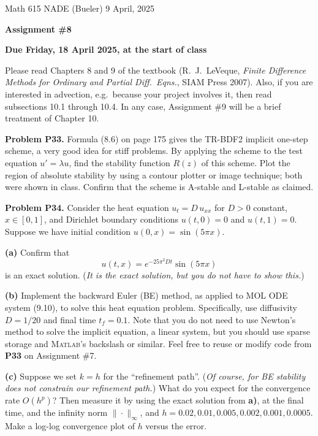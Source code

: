 \documentclass[12pt]{amsart}
\newcommand{\Matlab}{\textsc{Matlab}\xspace}
\newcommand{\prob}[1]{\bigskip\noindent\textbf{#1}\quad }
\newcommand{\epart}[1]{\medskip\noindent\textbf{(#1)}\quad }
\begin{document}
\scriptsize \noindent Math 615 NADE (Bueler) \hfill 9 April, 2025
\normalsize

\medskip\bigskip

\Large\centerline{\textbf{Assignment \#8}}
\large
\bigskip

\centerline{\textbf{Due Friday, 18 April 2025, at the start of class}}
\bigskip
\normalsize

\thispagestyle{empty}

\bigskip
Please read Chapters 8 and 9 of the textbook (R.~J.~LeVeque, \emph{Finite Difference Methods for Ordinary and Partial Diff.~Eqns.}, SIAM Press 2007).  Also, if you are interested in advection, e.g.~because your project involves it, then read subsections 10.1 through 10.4.  In any case, Assignment \#9 will be a brief treatment of Chapter 10.

\medskip

\prob{Problem P33.}  Formula (8.6) on page 175 gives the TR-BDF2 implicit one-step scheme, a very good idea for stiff problems.  By applying the scheme to the test equation $u'=\lambda u$, find the stability function $R(z)$ of this scheme.  Plot the region of absolute stability by using a contour plotter or image technique; both were shown in class.  Confirm that the scheme is A-stable and L-stable as claimed.


\prob{Problem P34.}  Consider the heat equation $u_t = D\, u_{xx}$ for $D>0$ constant, $x\in [0,1]$, and Dirichlet boundary conditions $u(t,0)=0$ and $u(t,1)=0$.  Suppose we have initial condition $u(0,x) = \sin(5\pi x)$.

\epart{a}  Confirm that
    $$u(t,x) = e^{-25 \pi^2 D t} \sin(5 \pi x)$$
is an exact solution.  (\emph{It is \emph{the} exact solution, but you do not have to show this.})

\epart{b}  Implement the backward Euler (BE) method, as applied to MOL ODE system (9.10), to solve this heat equation problem.  Specifically, use diffusivity $D = 1/20$ and final time $t_f=0.1$.  Note that you do not need to use Newton's method to solve the implicit equation, a linear system, but you should use sparse storage and \Matlab's backslash or similar.  Feel free to reuse or modify code from \textbf{P33} on Assignment \#7.

\epart{c}  Suppose we set $k=h$ for the ``refinement path''.  (\emph{Of course, for BE stability \emph{does not} constrain our refinement path.})  What do you expect for the convergence rate $O(h^p)$?  Then measure it by using the exact solution from \textbf{a)}, at the final time, and the infinity norm $\|\cdot\|_\infty$, and $h=0.02, 0.01,0.005,0.002,0.001,0.0005$.  Make a log-log convergence plot of $h$ versus the error.
\end{document}
